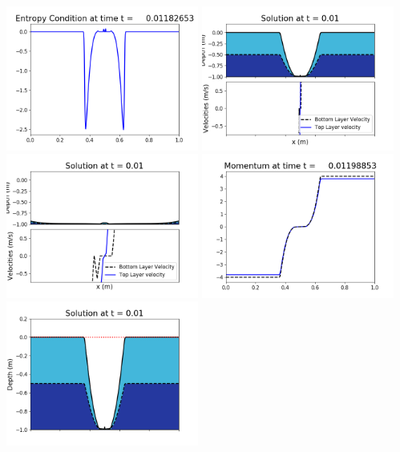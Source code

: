 \documentclass[11pt]{article}
\begin{document}
\vskip 10pt 
\includegraphics[width=0.475\textwidth]{frame0074fig1009.png}
\vskip 10pt 
\includegraphics[width=0.475\textwidth]{frame0075fig1001.png}
\includegraphics[width=0.475\textwidth]{frame0075fig1002.png}
\vskip 10pt 
\includegraphics[width=0.475\textwidth]{frame0075fig1003.png}
\includegraphics[width=0.475\textwidth]{frame0075fig1006.png}
\end{document}
